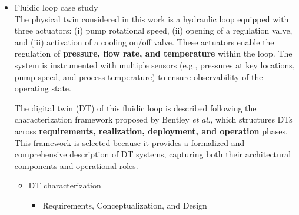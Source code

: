 \documentclass[
]{article}
\begin{document}
\begin{itemize}
\begin{itemize}
\begin{itemize}
      Although the deductive model may no longer be executed at usage
      time, its \textbf{structural assumptions and implied physical
      relationships are transferred} into the learned surrogate through
      the training dataset and learning objective {[}ref{]}. This
      constitutes \textbf{hybridization at creation}, because the
      integration occurs during the development phase rather than during
      run‑time operation.
    \end{itemize}
  \end{itemize}
\item
  Fluidic loop case study\\
  The physical twin considered in this work is a hydraulic loop equipped
  with three actuators: (i) pump rotational speed, (ii) opening of a
  regulation valve, and (iii) activation of a cooling on/off valve.
  These actuators enable the regulation of \textbf{pressure, flow rate,
  and temperature} within the loop. The system is instrumented with
  multiple sensors (e.g., pressures at key locations, pump speed, and
  process temperature) to ensure observability of the operating state.

  The digital twin (DT) of this fluidic loop is described following the
  characterization framework proposed by Bentley \emph{et al.}, which
  structures DTs across \textbf{requirements, realization, deployment,
  and operation} phases. This framework is selected because it provides
  a formalized and comprehensive description of DT systems, capturing
  both their architectural components and operational roles.

  \begin{itemize}
  \item
    DT characterization

    \begin{itemize}
    \item
      Requirements, Conceptualization, and Design


\end{itemize}
\end{itemize}
\end{itemize}
\end{document}
